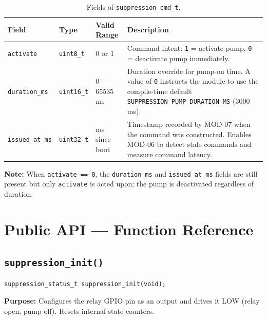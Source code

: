\documentclass[12pt]{article}
\begin{document}
\begin{table}[H]
\centering\small
\begin{tabularx}{\textwidth}{L{3.5cm} L{2.5cm} L{2.5cm} X}
\toprule
\textbf{Field} & \textbf{Type} & \textbf{Valid Range} & \textbf{Description} \\
\midrule
\texttt{activate} & \texttt{uint8\_t} & 0 or 1 & Command intent: \texttt{1} = activate pump, \texttt{0} = deactivate pump immediately. \\[4pt]
\texttt{duration\_ms} & \texttt{uint16\_t} & 0 -- 65535 ms & Duration override for pump-on time. A value of \texttt{0} instructs the module to use the compile-time default \texttt{SUPPRESSION\_PUMP\_DURATION\_MS} (3000 ms). \\[4pt]
\texttt{issued\_at\_ms} & \texttt{uint32\_t} & ms since boot & Timestamp recorded by MOD-07 when the command was constructed. Enables MOD-06 to detect stale commands and measure command latency. \\
\bottomrule
\end{tabularx}
\caption{Fields of \texttt{suppression\_cmd\_t}.}
\end{table}

\begin{notebox}
\textbf{Note:} When \texttt{activate == 0}, the \texttt{duration\_ms} and \texttt{issued\_at\_ms} fields are still present but only \texttt{activate} is acted upon; the pump is deactivated regardless of duration.
\end{notebox}

\section{Public API --- Function Reference}

\subsection{\texttt{suppression\_init()}}

\begin{lstlisting}[style=cstyle, numbers=none]
suppression_status_t suppression_init(void);
\end{lstlisting}

\textbf{Purpose:} Configures the relay GPIO pin as an output and drives it LOW (relay open, pump off). Resets internal state counters.
\end{document}
